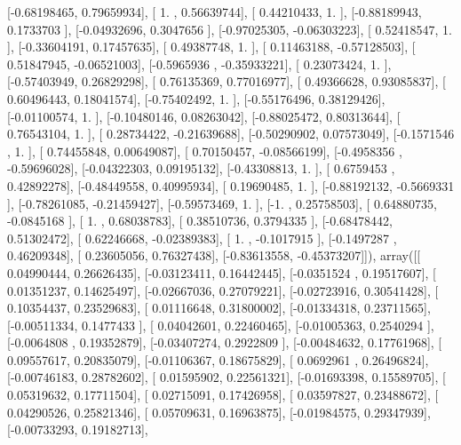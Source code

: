 \documentclass{article}
\begin{document}
       [-0.68198465,  0.79659934],
       [ 1.        ,  0.56639744],
       [ 0.44210433,  1.        ],
       [-0.88189943,  0.1733703 ],
       [-0.04932696,  0.3047656 ],
       [-0.97025305, -0.06303223],
       [ 0.52418547,  1.        ],
       [-0.33604191,  0.17457635],
       [ 0.49387748,  1.        ],
       [ 0.11463188, -0.57128503],
       [ 0.51847945, -0.06521003],
       [-0.5965936 , -0.35933221],
       [ 0.23073424,  1.        ],
       [-0.57403949,  0.26829298],
       [ 0.76135369,  0.77016977],
       [ 0.49366628,  0.93085837],
       [ 0.60496443,  0.18041574],
       [-0.75402492,  1.        ],
       [-0.55176496,  0.38129426],
       [-0.01100574,  1.        ],
       [-0.10480146,  0.08263042],
       [-0.88025472,  0.80313644],
       [ 0.76543104,  1.        ],
       [ 0.28734422, -0.21639688],
       [-0.50290902,  0.07573049],
       [-0.1571546 ,  1.        ],
       [ 0.74455848,  0.00649087],
       [ 0.70150457, -0.08566199],
       [-0.4958356 , -0.59696028],
       [-0.04322303,  0.09195132],
       [-0.43308813,  1.        ],
       [ 0.6759453 ,  0.42892278],
       [-0.48449558,  0.40995934],
       [ 0.19690485,  1.        ],
       [-0.88192132, -0.5669331 ],
       [-0.78261085, -0.21459427],
       [-0.59573469,  1.        ],
       [-1.        ,  0.25758503],
       [ 0.64880735, -0.0845168 ],
       [ 1.        ,  0.68038783],
       [ 0.38510736,  0.3794335 ],
       [-0.68478442,  0.51302472],
       [ 0.62246668, -0.02389383],
       [ 1.        , -0.1017915 ],
       [-0.1497287 ,  0.46209348],
       [ 0.23605056,  0.76327438],
       [-0.83613558, -0.45373207]]), array([[ 0.04990444,  0.26626435],
       [-0.03123411,  0.16442445],
       [-0.0351524 ,  0.19517607],
       [ 0.01351237,  0.14625497],
       [-0.02667036,  0.27079221],
       [-0.02723916,  0.30541428],
       [ 0.10354437,  0.23529683],
       [ 0.01116648,  0.31800002],
       [-0.01334318,  0.23711565],
       [-0.00511334,  0.1477433 ],
       [ 0.04042601,  0.22460465],
       [-0.01005363,  0.2540294 ],
       [-0.0064808 ,  0.19352879],
       [-0.03407274,  0.2922809 ],
       [-0.00484632,  0.17761968],
       [ 0.09557617,  0.20835079],
       [-0.01106367,  0.18675829],
       [ 0.0692961 ,  0.26496824],
       [-0.00746183,  0.28782602],
       [ 0.01595902,  0.22561321],
       [-0.01693398,  0.15589705],
       [ 0.05319632,  0.17711504],
       [ 0.02715091,  0.17426958],
       [ 0.03597827,  0.23488672],
       [ 0.04290526,  0.25821346],
       [ 0.05709631,  0.16963875],
       [-0.01984575,  0.29347939],
       [-0.00733293,  0.19182713],
\end{document}
